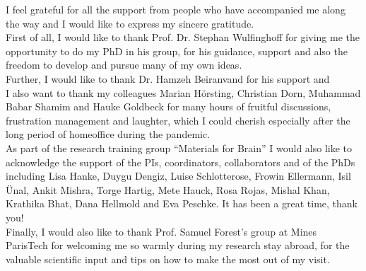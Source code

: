 I feel grateful for all the support from people who have accompanied me along the way and I would like to express my sincere gratitude.\\

First of all, I would like to thank Prof. Dr. Stephan Wulfinghoff for giving me the opportunity to do my PhD in his group, for his guidance, support and also the freedom to develop and pursue many of my own ideas. \\

Further, I would like to thank Dr. Hamzeh Beiranvand for his support and  \\

I also want to thank my colleagues Marian Hörsting, Christian Dorn, Muhammad Babar Shamim and Hauke Goldbeck for many hours of fruitful discussions, frustration management and laughter, which I could cherish especially after the long period of homeoffice during the pandemic.\\

As part of the research training group ``Materials for Brain'' I would also like to acknowledge the support of the PIs, coordinators, collaborators and of the PhDs including Lisa Hanke, Duygu Dengiz, Luise Schlotterose, Frowin Ellermann, Isil Ünal, Ankit Mishra, Torge Hartig, Mete Hauck, Rosa Rojas, Mishal Khan, Krathika Bhat, Dana Hellmold and Eva Peschke. It has been a great time, thank you!\\

Finally, I would also like to thank Prof. Samuel Forest's group at Mines ParisTech for welcoming me so warmly during my research stay abroad, for the valuable scientific input and tips on how to make the most out of my visit.\\

